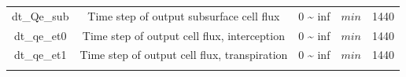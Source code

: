 \documentclass[]{scrbook}
\begin{document}
\begin{longtable}[]{@{}ccccc@{}}
\begin{minipage}[t]{0.17\columnwidth}
dt\_Qe\_sub\strut
\end{minipage} & \begin{minipage}[t]{0.23\columnwidth}\centering\strut
Time step of output subsurface cell flux\strut
\end{minipage} & \begin{minipage}[t]{0.10\columnwidth}\centering\strut
0 \textasciitilde{} inf\strut
\end{minipage} & \begin{minipage}[t]{0.10\columnwidth}\centering\strut
\(min\)\strut
\end{minipage} & \begin{minipage}[t]{0.26\columnwidth}\centering\strut
1440\strut
\end{minipage}\tabularnewline
\begin{minipage}[t]{0.17\columnwidth}\centering\strut
dt\_qe\_et0\strut
\end{minipage} & \begin{minipage}[t]{0.23\columnwidth}\centering\strut
Time step of output cell flux, interception\strut
\end{minipage} & \begin{minipage}[t]{0.10\columnwidth}\centering\strut
0 \textasciitilde{} inf\strut
\end{minipage} & \begin{minipage}[t]{0.10\columnwidth}\centering\strut
\(min\)\strut
\end{minipage} & \begin{minipage}[t]{0.26\columnwidth}\centering\strut
1440\strut
\end{minipage}\tabularnewline
\begin{minipage}[t]{0.17\columnwidth}\centering\strut
dt\_qe\_et1\strut
\end{minipage} & \begin{minipage}[t]{0.23\columnwidth}\centering\strut
Time step of output cell flux, transpiration\strut
\end{minipage} & \begin{minipage}[t]{0.10\columnwidth}\centering\strut
0 \textasciitilde{} inf\strut
\end{minipage} & \begin{minipage}[t]{0.10\columnwidth}\centering\strut
\(min\)\strut
\end{minipage} & \begin{minipage}[t]{0.26\columnwidth}\centering\strut
1440\strut
\end{minipage}\tabularnewline
\begin{minipage}[t]{0.17\columnwidth}\centering\strut

\end{minipage}
\end{longtable}
\end{document}
